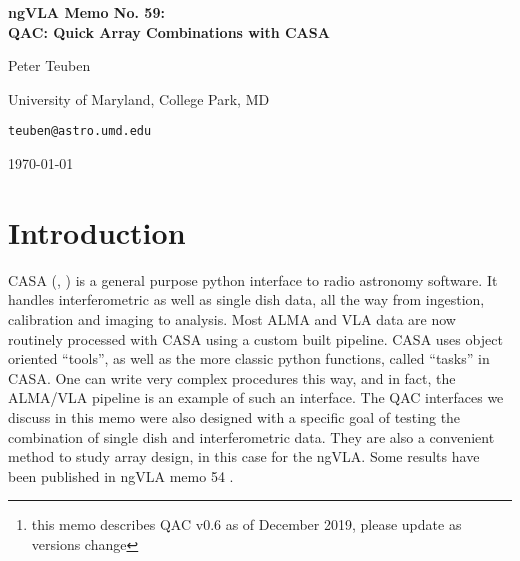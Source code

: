 \documentclass[12pt,a4paper]{article}
\begin{document}
\pagestyle{plain}
 

\begin{center}
  {\Large{\bf{ngVLA Memo No. 59: \\ QAC: Quick Array Combinations with CASA}}}
\end{center}

\bigskip

\centerline{Peter Teuben}
\centerline{University of Maryland, College Park, MD}
\centerline{{\tt teuben@astro.umd.edu}}

\centerline{\today}
\bigskip


\begin{abstract}

QAC is a simple python layer in CASA, developed to aid in writing
scripts for array (single dish and interferometric) combinations and
simulations. Although initially developed for TP2VIS, running
simulations and comparing with other array combination methods, this
package turned out to be useful for array design studies as well. Both
ALMA and ngVLA simulations are already supported, but extending
to more generic arrays is straightforward.
This memo complements ngVLA memo 54,
where QAC V0.3\footnote{this memo describes QAC v0.6 as of December 2019,
please update as versions change}
was used for an array design study. QAC is probably less useful for
real data, where more CASA flexibility might be needed,
but does contain some useful functions that do not depend on the
simulation environment.


\end{abstract}




\section{Introduction}

CASA (\cite{casa1}, \cite{casa2}) 
is a general purpose python interface to radio
astronomy software. It handles interferometric as well as single dish
data, all the way from ingestion, calibration and imaging to
analysis. Most ALMA and VLA data are now routinely processed with CASA
using a custom built pipeline.  CASA uses object oriented
``tools'', as well as the more classic python functions, called
``tasks'' in CASA. One can write very complex procedures this way, and in fact, the
ALMA/VLA pipeline is an example of such an interface. The QAC
interfaces we discuss in this memo were also designed with a specific
goal of testing the combination of single dish and interferometric data. They
are also a convenient method to study array design, in this case for the ngVLA.
Some results have been published in ngVLA memo 54 \citep{memo54}.
\end{document}
